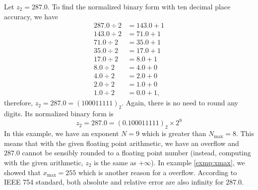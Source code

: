 \begin{exmp}
    Let \(z_2 = 287.0\). To find the normalized binary form with ten decimal place accuracy, we have
    \begin{align*}
        287.0 \div 2 &= 143.0 + 1 \\
        143.0 \div 2 &= 71.0 + 1 \\
        71.0 \div 2 &= 35.0 + 1 \\
        35.0 \div 2 &= 17.0 + 1 \\
        17.0 \div 2 &= 8.0 + 1 \\
        8.0 \div 2 &= 4.0 + 0 \\
        4.0 \div 2 &= 2.0 + 0 \\
        2.0 \div 2 &= 1.0 + 0 \\
        1.0 \div 2 &= 0.0 + 1 \text{,}
    \end{align*}
    therefore, \(z_2 = 287.0 = (100011111)_2\). Again, there is no need to round any digits. Its normalized binary form is
    \begin{equation*}
        z_2 = 287.0 = (0.100011111)_2 \times 2^9
    \end{equation*}
    In this example, we have an exponent \(N = 9\) which is greater than \(N_{\text{max}} = 8\). This means that with the given floating point arithmetic, we have an overflow and \(287.0\) cannot be sensibly rounded to a floating point number (instead, computing with the given arithmetic, \(z_2\) is the same as \(+\infty\)). In example \ref{exmp:xmax}, we showed that \(x_{\text{max}} = 255\) which is another reason for a overflow.
    According to IEEE 754 standard, both absolute and relative error are also infinity for \(287.0\).
\end{exmp}
%
%
